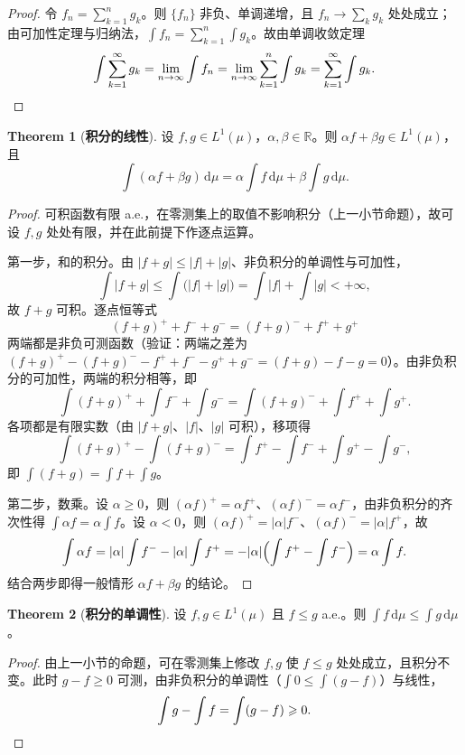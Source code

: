 \documentclass[oneside]{book}
\theoremstyle{definition}
\newcommand{\R}{\mathbb{R}}
\newcommand{\dd}{\mathrm{d}}
\theoremstyle{definition}
\newtheorem{theorem}{Theorem}[section]
\begin{document}
	\begin{proof}
		令 $f_n=\sum_{k=1}^{n}g_k$。则 $\{f_n\}$ 非负、单调递增，且 $f_n\to\sum_k g_k$ 处处成立；由可加性定理与归纳法，$\int f_n=\sum_{k=1}^{n}\int g_k$。故由单调收敛定理
		\[
		\int\sum_{k=1}^{\infty}g_k=\lim_{n\to\infty}\int f_n=\lim_{n\to\infty}\sum_{k=1}^{n}\int g_k=\sum_{k=1}^{\infty}\int g_k .\qedhere
		\]
	\end{proof}
	
	\begin{theorem}[\bfseries{积分的线性}]
		设 $f,g\in L^{1}(\mu)$，$\alpha,\beta\in\R$。则 $\alpha f+\beta g\in L^{1}(\mu)$，且
		\[
		\int(\alpha f+\beta g)\,\dd\mu=\alpha\int f\,\dd\mu+\beta\int g\,\dd\mu .
		\]
	\end{theorem}
	
	\begin{proof}
		可积函数有限 a.e.，在零测集上的取值不影响积分（上一小节命题），故可设 $f,g$ 处处有限，并在此前提下作逐点运算。
		
		第一步，和的积分。由 $|f+g|\leqslant|f|+|g|$、非负积分的单调性与可加性，
		\[
		\int|f+g|\leqslant\int\bigl(|f|+|g|\bigr)=\int|f|+\int|g|<+\infty ,
		\]
		故 $f+g$ 可积。逐点恒等式
		\[
		(f+g)^{+}+f^{-}+g^{-}=(f+g)^{-}+f^{+}+g^{+}
		\]
		两端都是非负可测函数（验证：两端之差为 $(f+g)^{+}-(f+g)^{-}-f^{+}+f^{-}-g^{+}+g^{-}=(f+g)-f-g=0$）。由非负积分的可加性，两端的积分相等，即
		\[
		\int(f+g)^{+}+\int f^{-}+\int g^{-}=\int(f+g)^{-}+\int f^{+}+\int g^{+}.
		\]
		各项都是有限实数（由 $|f+g|$、$|f|$、$|g|$ 可积），移项得
		\[
		\int(f+g)^{+}-\int(f+g)^{-}=\int f^{+}-\int f^{-}+\int g^{+}-\int g^{-},
		\]
		即 $\int(f+g)=\int f+\int g$。
		
		第二步，数乘。设 $\alpha\geqslant0$，则 $(\alpha f)^{+}=\alpha f^{+}$、$(\alpha f)^{-}=\alpha f^{-}$，由非负积分的齐次性得 $\int\alpha f=\alpha\int f$。设 $\alpha<0$，则 $(\alpha f)^{+}=|\alpha|f^{-}$、$(\alpha f)^{-}=|\alpha|f^{+}$，故
		\[
		\int\alpha f=|\alpha|\int f^{-}-|\alpha|\int f^{+}=-|\alpha|\Bigl(\int f^{+}-\int f^{-}\Bigr)=\alpha\int f .
		\]
		结合两步即得一般情形 $\alpha f+\beta g$ 的结论。
	\end{proof}
	
	\begin{theorem}[\bfseries{积分的单调性}]
		设 $f,g\in L^{1}(\mu)$ 且 $f\leqslant g$ a.e.。则 $\int f\,\dd\mu\leqslant\int g\,\dd\mu$。
	\end{theorem}
	
	\begin{proof}
		由上一小节的命题，可在零测集上修改 $f,g$ 使 $f\leqslant g$ 处处成立，且积分不变。此时 $g-f\geqslant0$ 可测，由非负积分的单调性（$\int0\leqslant\int(g-f)$）与线性，
		\[
		\int g-\int f=\int(g-f)\geqslant0 .\qedhere
		\]
	\end{proof}
	
\end{document}
